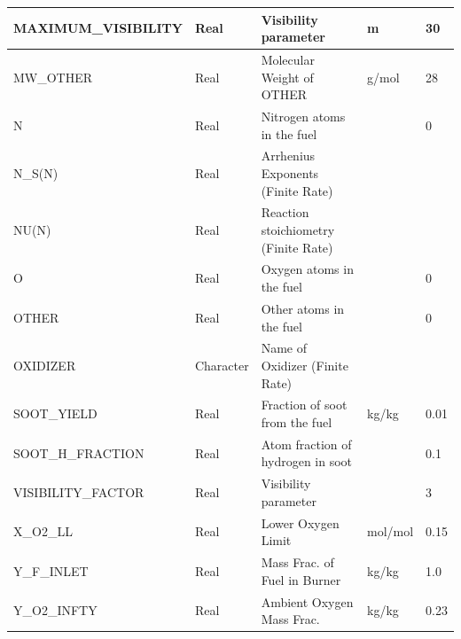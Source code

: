 \documentclass[11pt]{book}
\begin{document}
\begin{table}[H]
\begin{tabular*}{\textwidth}{@{\extracolsep{\fill}}|l|l|l|l|l|}
{\ct MAXIMUM\_VISIBILITY}                 & Real        & Visibility parameter                      &  m                &     30   \\ \hline
{\ct MW\_OTHER}                           & Real        & Molecular Weight of {\ct OTHER}           &  g/mol            & 28      \\ \hline
{\ct N}                                   & Real        & Nitrogen atoms in the fuel                &                   & 0    \\ \hline
{\ct N\_S(N)}                             & Real        & Arrhenius Exponents (Finite Rate)         &                   &     \\ \hline
{\ct NU(N)}                               & Real        & Reaction stoichiometry (Finite Rate)      &                   &     \\ \hline
{\ct O}                                   & Real        & Oxygen atoms in the fuel                  &                   & 0    \\ \hline
{\ct OTHER}                               & Real        & Other atoms in the fuel                   &                   & 0    \\ \hline
{\ct OXIDIZER}                            & Character   & Name of Oxidizer (Finite Rate)            &                   &         \\ \hline
{\ct SOOT\_YIELD}                         & Real        & Fraction of soot from the fuel            & kg/kg             & 0.01    \\ \hline
{\ct SOOT\_H\_FRACTION}                   & Real        & Atom fraction of hydrogen in soot         &                   & 0.1    \\ \hline
{\ct VISIBILITY\_FACTOR}                  & Real        & Visibility parameter                      &                   &     3   \\ \hline
{\ct X\_O2\_LL}                           & Real        & Lower Oxygen Limit                        &  mol/mol          & 0.15    \\ \hline
{\ct Y\_F\_INLET}                         & Real        & Mass Frac. of Fuel in Burner              &  kg/kg            & 1.0     \\ \hline
{\ct Y\_O2\_INFTY}                        & Real        & Ambient Oxygen Mass Frac.                 &  kg/kg            & 0.23    \\ \hline
\end{tabular*}
\end{table}
\end{document}

